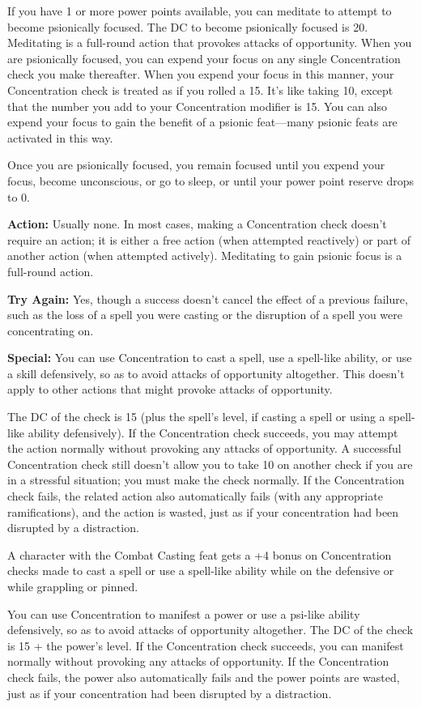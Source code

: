 If you have 1 or more power points available, you can meditate to attempt to become psionically focused. The DC to become psionically focused is 20. Meditating is a full-round action that provokes attacks of opportunity. When you are psionically focused, you can expend your focus on any single Concentration check you make thereafter. When you expend your focus in this manner, your Concentration check is treated as if you rolled a 15. It's like taking 10, except that the number you add to your Concentration modifier is 15. You can also expend your focus to gain the benefit of a psionic feat---many psionic feats are activated in this way.

Once you are psionically focused, you remain focused until you expend your focus, become unconscious, or go to sleep, or until your power point reserve drops to 0.

\textbf{Action:} Usually none. In most cases, making a Concentration check doesn't require an action; it is either a free action (when attempted reactively) or part of another action (when attempted actively). Meditating to gain psionic focus is a full-round action.

\textbf{Try Again:} Yes, though a success doesn't cancel the effect of a previous failure, such as the loss of a spell you were casting or the disruption of a spell you were concentrating on.

\textbf{Special:} You can use Concentration to cast a spell, use a spell-like ability, or use a skill defensively, so as to avoid attacks of opportunity altogether. This doesn't apply to other actions that might provoke attacks of opportunity.

The DC of the check is 15 (plus the spell's level, if casting a spell or using a spell-like ability defensively). If the Concentration check succeeds, you may attempt the action normally without provoking any attacks of opportunity. A successful Concentration check still doesn't allow you to take 10 on another check if you are in a stressful situation; you must make the check normally. If the Concentration check fails, the related action also automatically fails (with any appropriate ramifications), and the action is wasted, just as if your concentration had been disrupted by a distraction.

A character with the Combat Casting feat gets a +4 bonus on Concentration checks made to cast a spell or use a spell-like ability while on the defensive or while grappling or pinned.

You can use Concentration to manifest a power or use a psi-like ability defensively, so as to avoid attacks of opportunity altogether. The DC of the check is 15 + the power's level. If the Concentration check succeeds, you can manifest normally without provoking any attacks of opportunity. If the Concentration check fails, the power also automatically fails and the power points are wasted, just as if your concentration had been disrupted by a distraction.

